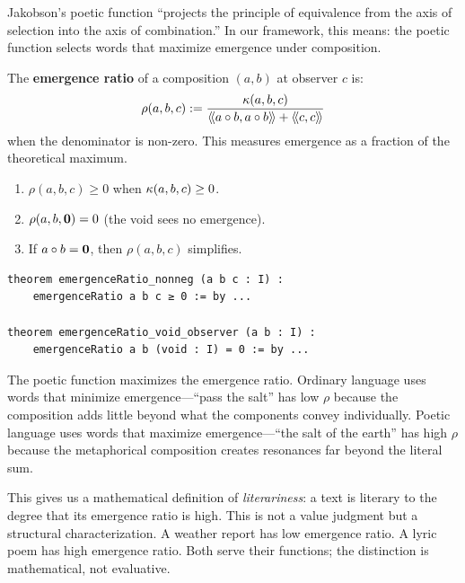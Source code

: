 Jakobson's poetic function ``projects the principle of equivalence from the axis
of selection into the axis of combination.'' In our framework, this means: the
poetic function selects words that maximize emergence under composition.

\begin{definition}
\label{def:emergence-ratio}
The \textbf{emergence ratio} of a composition $(a, b)$ at observer $c$ is:
\[
  \rho(a, b, c) := \frac{\kappa(a, b, c)}{\langle\!\langle a \circ b, a \circ b \rangle\!\rangle + \langle\!\langle c, c \rangle\!\rangle}
\]
when the denominator is non-zero. This measures emergence as a fraction of the
theoretical maximum.
\end{definition}

\begin{theorem}
\label{thm:emergence-ratio}
\begin{enumerate}
  \item $\rho(a, b, c) \geq 0$ when $\kappa(a,b,c) \geq 0$.
  \item $\rho(a, b, \mathbf{0}) = 0$ (the void sees no emergence).
  \item If $a \circ b = \mathbf{0}$, then $\rho(a, b, c)$ simplifies.
\end{enumerate}
\end{theorem}

\begin{lstlisting}[caption={Emergence ratio (IDT\_v3\_Emergence.lean)}]
theorem emergenceRatio_nonneg (a b c : I) :
    emergenceRatio a b c ≥ 0 := by ...

theorem emergenceRatio_void_observer (a b : I) :
    emergenceRatio a b (void : I) = 0 := by ...
\end{lstlisting}

\begin{interpretation}
The poetic function maximizes the emergence ratio. Ordinary language uses
words that minimize emergence---``pass the salt'' has low $\rho$ because the
composition adds little beyond what the components convey individually. Poetic
language uses words that maximize emergence---``the salt of the earth'' has
high $\rho$ because the metaphorical composition creates resonances far beyond
the literal sum.

This gives us a mathematical definition of \emph{literariness}: a text is
literary to the degree that its emergence ratio is high. This is not a value
judgment but a structural characterization. A weather report has low emergence
ratio. A lyric poem has high emergence ratio. Both serve their functions;
the distinction is mathematical, not evaluative.
\end{interpretation}


